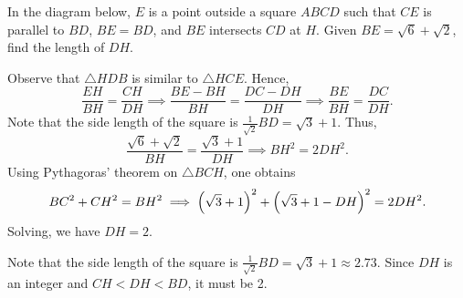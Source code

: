 \begin{question}[2]\label{A::2022-O-1-19}
    In the diagram below, $E$ is a point outside a square $ABCD$ such that $CE$ is parallel to $BD$, $BE = BD$, and $BE$ intersects $CD$ at $H$. Given $BE = \sqrt6 + \sqrt2$, find the length of $DH$.

    \begin{center}
    \end{center}
\end{question}
\begin{solution}
    Observe that $\triangle HDB$ is similar to $\triangle HCE$. Hence, \[\frac{EH}{BH} = \frac{CH}{DH} \implies \frac{BE-BH}{BH} = \frac{DC-DH}{DH} \implies \frac{BE}{BH} = \frac{DC}{DH}.\] Note that the side length of the square is $\frac1{\sqrt2} BD = \sqrt3 + 1$. Thus, \[\frac{\sqrt6 + \sqrt2}{BH} = \frac{\sqrt3 + 1}{DH} \implies BH^2 = 2DH^2.\] Using Pythagoras' theorem on $\triangle BCH$, one obtains \[BC^2 + CH^2 = BH^2 \implies \left( \sqrt3 + 1 \right)^2 + \left( \sqrt3 + 1 - DH \right)^2 = 2DH^2.\] Solving, we have $DH = 2$.
\end{solution}
\begin{solution}
    Note that the side length of the square is $\frac1{\sqrt2} BD = \sqrt3 + 1 \approx 2.73$. Since $DH$ is an integer and $CH < DH < BD$, it must be 2.
\end{solution}

